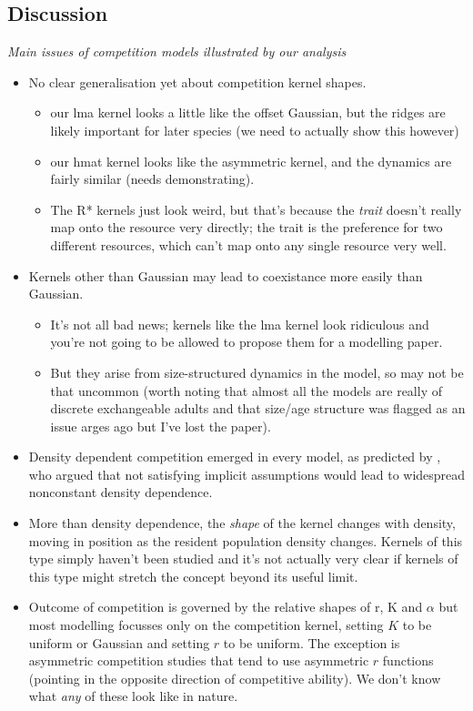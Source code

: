\documentclass[a4paper,11pt]{article}
\begin{document}
\begin{itemize}
\clearpage
\section{Discussion}

\textit{Main issues of competition models illustrated by our analysis}
\begin{itemize}
\item No clear generalisation yet about competition kernel shapes.
  \begin{itemize}
  \item our lma kernel looks a little like the
    \citet{Roughgarden-1979} offset Gaussian, but the ridges are
    likely important for later species (we need to actually show this
    however)
  \item our hmat kernel looks like the \citet{Kisdi-1999} asymmetric
    kernel, and the dynamics are fairly similar (needs
    demonstrating).
  \item The R* kernels just look weird, but that's because the
    \emph{trait} doesn't really map onto the resource very directly;
    the trait is the preference for two different resources, which
    can't map onto any single resource very well.
  \end{itemize}
\item Kernels other than Gaussian may lead to coexistance more easily
  than Gaussian.
  \begin{itemize}
  \item It's not all bad news; kernels like the lma kernel look
    ridiculous and you're not going to be allowed to propose them for
    a modelling paper.
  \item But they arise from size-structured dynamics in the model, so
    may not be that uncommon (worth noting that almost all the models
    are really of discrete exchangeable adults and that size/age
    structure was flagged as an issue arges ago but I've lost the
    paper).
  \end{itemize}
\item Density dependent competition emerged in every model, as
  predicted by \citet{Abrams-1980}, who argued that not satisfying
  implicit assumptions would lead to widespread nonconstant density
  dependence.
\item More than density dependence, the \emph{shape} of the kernel
  changes with density, moving in position as the resident population
  density changes.  Kernels of this type simply haven't been studied
  and it's not actually very clear if kernels of this type might
  stretch the concept beyond its useful limit.
\item Outcome of competition is governed by the relative shapes of r,
  K and $\alpha$ but most modelling focusses only on the competition
  kernel, setting $K$ to be uniform or Gaussian and setting $r$ to be
  uniform.  The exception is asymmetric competition studies that tend
  to use asymmetric $r$ functions (pointing in the opposite direction
  of competitive ability). We don't know what \emph{any} of these look
  like in nature.
\end{itemize}


\end{itemize}
\end{document}
